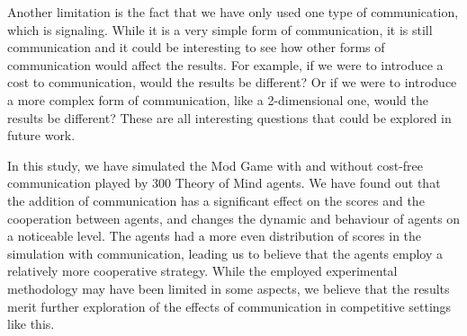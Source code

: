 Another limitation is the fact that we have only used one type of communication, which is signaling. While it is a very simple form of communication, it is still communication and it could be interesting to see how other forms of communication would affect the results. For example, if we were to introduce a cost to communication, would the results be different? Or if we were to introduce a more complex form of communication, like a 2-dimensional one, would the results be different? These are all interesting questions that could be explored in future work.

In this study, we have simulated the Mod Game with and without cost-free communication played by 300 Theory of Mind agents. We have found out that the addition of communication has a significant effect on the scores and the cooperation between agents, and changes the dynamic and behaviour of agents on a noticeable level. The agents had a more even distribution of scores in the simulation with communication, leading us to believe that the agents employ a relatively more cooperative strategy. While the employed experimental methodology may have been limited in some aspects, we believe that the results merit further exploration of the effects of communication in competitive settings like this.
